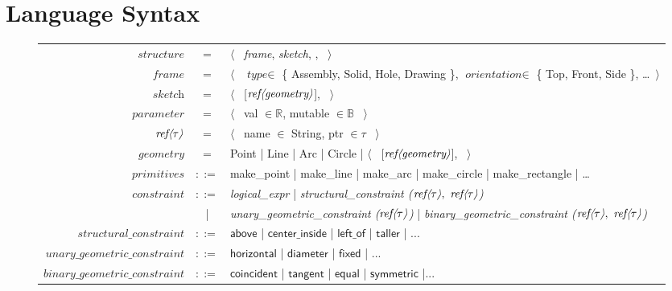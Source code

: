 \section{Language Syntax}

\begin{figure*}[htbp]
\scriptsize
\begin{tabular}{rcl}
\toprule
$\textit{structure}$ & $=$ & $\langle$ \ \textit{frame}, \: \textit{sketch}, ,  \ $\rangle$ \\
$\textit{frame}$ & $=$ & $\langle$ \ $\textit{type} \in$ \{ Assembly, Solid, Hole, Drawing \}, \: $\textit{orientation} \in$ \{ Top, Front, Side \}, \: \ldots \ $\rangle$ \\
$\textit{sketch}$ & $=$ & $\langle$ \ [$\textit{ref\textlangle geometry\textrangle}$],  \ $\rangle$ \\
$\textit{parameter}$ & $=$ & $\langle$ \ val $\in \mathbb{R}$, \: mutable $\in \mathbb{B}$ \ $\rangle$ \\
$\textit{ref\textlangle $\tau$\textrangle}$ & $=$ & $\langle$ \ name $\in$ String, \: ptr $\in \tau$ \ $\rangle$ \\
$\textit{geometry}$ & $=$ & Point \: | \: Line \: | \: Arc \: | \: Circle \: | \: $\langle$ \ [$\textit{ref\textlangle geometry\textrangle}$],  \ $\rangle$ \\
\midrule
$\textit{primitives}$ & $::=$ & make\_point \: | \: make\_line \: | \: make\_arc \: | \: make\_circle \: | \: make\_rectangle \: | \: \ldots \\
$\textit{constraint}$ & $::=$ & \textit{logical\_expr} \: | \: \textit{structural\_constraint ($\textit{ref\textlangle $\tau$\textrangle}, \ \textit{ref\textlangle $\tau$\textrangle}$)} \\
                    & | & \textit{unary\_geometric\_constraint ($\textit{ref\textlangle $\tau$\textrangle}$)} \: | \: \textit{binary\_geometric\_constraint ($\textit{ref\textlangle $\tau$\textrangle}, \ \textit{ref\textlangle $\tau$\textrangle}$)} \\ 
$\textit{structural\_constraint}$ & $::=$ & $\mathsf{above}$ | $\mathsf{center\_inside}$ | $\mathsf{left\_of}$ | $\mathsf{taller}$ | ... \\
$\textit{unary\_geometric\_constraint}$ & $::=$ & $\mathsf{horizontal}$ | $\mathsf{diameter}$ | $\mathsf{fixed}$ | ...  \\
$\textit{binary\_geometric\_constraint}$ & $::=$ & $\mathsf{coincident}$ | $\mathsf{tangent}$ | $\mathsf{equal}$ | $\mathsf{symmetric}$ |...  \\

\end{tabular}
\end{figure*}
